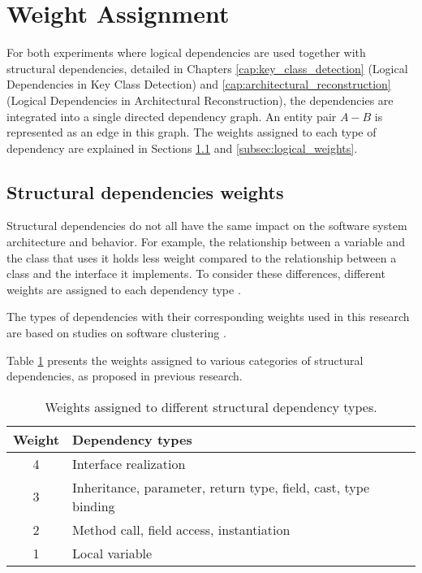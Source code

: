 \section{Weight Assignment}
\label{sec:weight_assignment}

\hspace{4em}For both experiments where logical dependencies are used together with structural dependencies, detailed in Chapters \ref{cap:key_class_detection} (Logical Dependencies in Key Class Detection) and \ref{cap:architectural_reconstruction} (Logical Dependencies in Architectural Reconstruction), the dependencies are integrated into a single directed dependency graph. An entity pair \( A - B \) is represented as an edge in this graph. The weights assigned to each type of dependency are explained in Sections \ref{subsec:structural_weights} and \ref{subsec:logical_weights}.

\subsection{Structural dependencies weights}
\label{subsec:structural_weights}

\hspace{4em}Structural dependencies do not all have the same impact on the software system architecture and behavior. For example, the relationship between a variable and the class that uses it holds less weight compared to the relationship between a class and the interface it implements. To consider these differences, different weights are assigned to each dependency type \cite{cluster-access}.

The types of dependencies with their corresponding weights used in this research are based on studies on software clustering \cite{SoraConti, Finding-key-classes}.

Table \ref{tab:structural_weights} presents the weights assigned to various categories of structural dependencies, as proposed in previous research.

\begin{table}[htbp]
\centering
\begin{tabular}{|c|l|}
\hline
\textbf{Weight} & \textbf{Dependency types} \\
\hline
4 & Interface realization \\
3 & Inheritance, parameter, return type, field, cast, type binding \\
2 & Method call, field access, instantiation \\
1 & Local variable \\
\hline
\end{tabular}
\caption{Weights assigned to different structural dependency types. \cite{Finding-key-classes, cluster-access}}
\label{tab:structural_weights}
\end{table}

